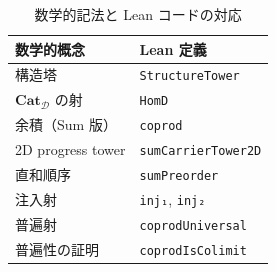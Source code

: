 \documentclass[a4paper,12pt]{ltjsarticle}
\theoremstyle{definition}
\begin{document}
\begin{table}[h]
\centering
\begin{tabular}{|l|l|}
\hline
\textbf{数学的概念} & \textbf{Lean 定義} \\ \hline
構造塔 & \texttt{StructureTower} \\
$\mathbf{Cat}_{\mathcal{D}}$ の射 & \texttt{HomD} \\
余積（Sum 版） & \texttt{coprod} \\
2D progress tower & \texttt{sumCarrierTower2D} \\
直和順序 & \texttt{sumPreorder} \\
注入射 & \texttt{inj₁}, \texttt{inj₂} \\
普遍射 & \texttt{coprodUniversal} \\
普遍性の証明 & \texttt{coprodIsColimit} \\ \hline
\end{tabular}
\caption{数学的記法と Lean コードの対応}
\end{table}
\end{document}
